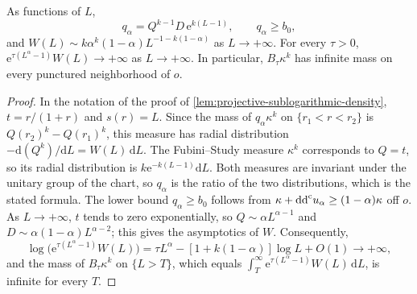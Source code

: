 \begin{lemma}\label{lem:projective-exponential-barrier-growth}
As functions of $L$,
\[
 q_\alpha=Q^{k-1}D\,\mathrm e^{k(L-1)},\qquad q_\alpha\geq b_0,
\]
and $W(L)\sim k\alpha^k(1-\alpha)L^{-1-k(1-\alpha)}$ as $L\to+\infty$.
For every $\tau>0$, $\mathrm e^{\tau(L^\alpha-1)}W(L)\to+\infty$ as $L\to+\infty$. In particular, $B_\tau\kappa^k$ has infinite mass on every punctured neighborhood of $o$.
\end{lemma}
\begin{proof}
In the notation of the proof of \cref{lem:projective-sublogarithmic-density}, $t=r/(1+r)$ and $s(r)=L$. Since the mass of $q_\alpha\kappa^k$ on $\{r_1<r<r_2\}$ is $Q(r_2)^k-Q(r_1)^k$, this measure has radial distribution $-\mathrm{d}(Q^k)/\mathrm{d}L=W(L)\,\mathrm{d}L$. The Fubini--Study measure $\kappa^k$ corresponds to $Q=t$, so its radial distribution is $k\mathrm e^{-k(L-1)}\mathrm{d}L$. Both measures are invariant under the unitary group of the chart, so $q_\alpha$ is the ratio of the two distributions, which is the stated formula. The lower bound $q_\alpha\geq b_0$ follows from $\kappa+\mathrm{dd}^{\mathrm{c}} u_\alpha\geq(1-\alpha)\kappa$ off $o$. As $L\to+\infty$, $t$ tends to zero exponentially, so $Q\sim\alpha L^{\alpha-1}$ and $D\sim\alpha(1-\alpha)L^{\alpha-2}$; this gives the asymptotics of $W$. Consequently,
\[
 \log\bigl(\mathrm e^{\tau(L^\alpha-1)}W(L)\bigr)=\tau L^\alpha-[1+k(1-\alpha)]\log L+O(1)\longrightarrow+\infty,
\]
and the mass of $B_\tau\kappa^k$ on $\{L>T\}$, which equals $\int_T^\infty\mathrm e^{\tau(L^\alpha-1)}W(L)\,\mathrm{d}L$, is infinite for every $T$.
\end{proof}


